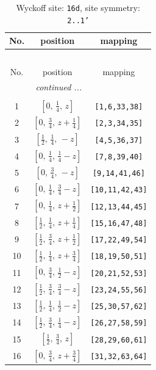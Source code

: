 \documentclass[fleqn,8pt]{jsarticle}
\begin{document}
\renewcommand{\arraystretch}{1.2}
\begin{longtable}{ccc}
\caption{Wyckoff site: {\tt 16d}, site symmetry: {\tt 2..1'}}
 \\
 \hline \hline
No. & position & mapping \\ \hline \endfirsthead

\multicolumn{2}{l}{\tablename\ \thetable{}} \\
 \hline \hline
No. & position & mapping \\ \hline \endhead

 \hline \hline
\multicolumn{2}{r}{\footnotesize\it continued ...} \\ \endfoot

 \hline \hline
\multicolumn{2}{r}{} \\ \endlastfoot

1 & $\left[ 0,\, \frac{1}{4},\, z \right]$ & {\tt [1,6,33,38]} \\ \hline
2 & $\left[ 0,\, \frac{3}{4},\, z + \frac{1}{4} \right]$ & {\tt [2,3,34,35]} \\ \hline
3 & $\left[ \frac{1}{2},\, \frac{1}{4},\, - z \right]$ & {\tt [4,5,36,37]} \\ \hline
4 & $\left[ 0,\, \frac{1}{4},\, \frac{1}{4} - z \right]$ & {\tt [7,8,39,40]} \\ \hline
5 & $\left[ 0,\, \frac{3}{4},\, - z \right]$ & {\tt [9,14,41,46]} \\ \hline
6 & $\left[ 0,\, \frac{1}{4},\, \frac{3}{4} - z \right]$ & {\tt [10,11,42,43]} \\ \hline
7 & $\left[ 0,\, \frac{1}{4},\, z + \frac{1}{2} \right]$ & {\tt [12,13,44,45]} \\ \hline
8 & $\left[ \frac{1}{2},\, \frac{1}{4},\, z + \frac{1}{4} \right]$ & {\tt [15,16,47,48]} \\ \hline
9 & $\left[ \frac{1}{2},\, \frac{3}{4},\, z + \frac{1}{2} \right]$ & {\tt [17,22,49,54]} \\ \hline
10 & $\left[ \frac{1}{2},\, \frac{1}{4},\, z + \frac{3}{4} \right]$ & {\tt [18,19,50,51]} \\ \hline
11 & $\left[ 0,\, \frac{3}{4},\, \frac{1}{2} - z \right]$ & {\tt [20,21,52,53]} \\ \hline
12 & $\left[ \frac{1}{2},\, \frac{3}{4},\, \frac{3}{4} - z \right]$ & {\tt [23,24,55,56]} \\ \hline
13 & $\left[ \frac{1}{2},\, \frac{1}{4},\, \frac{1}{2} - z \right]$ & {\tt [25,30,57,62]} \\ \hline
14 & $\left[ \frac{1}{2},\, \frac{3}{4},\, \frac{1}{4} - z \right]$ & {\tt [26,27,58,59]} \\ \hline
15 & $\left[ \frac{1}{2},\, \frac{3}{4},\, z \right]$ & {\tt [28,29,60,61]} \\ \hline
16 & $\left[ 0,\, \frac{3}{4},\, z + \frac{3}{4} \right]$ & {\tt [31,32,63,64]} \\
\end{longtable}
\end{document}
